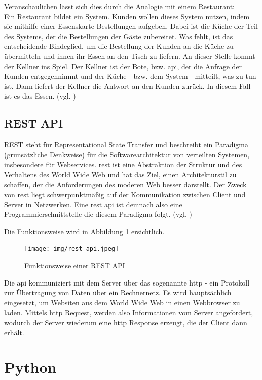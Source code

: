 \documentclass[oneside]{ausarbeitung}
\begin{document}
Veranschaulichen lässt sich dies durch die Analogie mit einem Restaurant: \\
Ein Restaurant bildet ein System. Kunden wollen dieses System nutzen, indem sie mithilfe einer Essenskarte Bestellungen aufgeben. Dabei ist die Küche der Teil des Systems, der die Bestellungen der Gäste zubereitet. Was fehlt, ist das entscheidende Bindeglied, um die Bestellung der Kunden an die Küche zu übermitteln und ihnen ihr Essen an den Tisch zu liefern. An dieser Stelle kommt der Kellner ins Spiel. Der Kellner ist der Bote, bzw. \ac{api}, der die Anfrage der Kunden entgegennimmt und der Küche - bzw. dem System - mitteilt, was zu tun ist. Dann liefert der Kellner die Antwort an den Kunden zurück. In diesem Fall ist es das Essen. (vgl. \cite{api_example})  

\subsection{REST API}
\label{sub:rest_api}
REST steht für Representational State Transfer und beschreibt ein Paradigma (grunsätzliche Denkweise) für die Softwarearchitektur von verteilten Systemen, insbesondere für Webservices. \ac{rest} ist eine Abstraktion der Struktur und des Verhaltens des World Wide Web und hat das Ziel, einen Architekturstil zu schaffen, der die Anforderungen des moderen Web besser darstellt. Der Zweck von \ac{rest} liegt schwerpunktmäßig auf der Kommunikation zwischen Client und Server in Netzwerken. Eine \ac{rest} \ac{api} ist demnach also eine Programmierschnittstelle die diesem Paradigma folgt. (vgl. \cite{rest})

Die Funktionsweise wird in Abbildung \ref{fig:5} ersichtlich.

\begin{figure}[H]
  \centering
  \texttt{[image: img/rest\_api.jpeg]}
  \caption{Funktionsweise einer REST API\cite{rest_pic}}
  \label{fig:5}
\end{figure}

Die \ac{api} kommuniziert mit dem Server über das sogenannte \ac{http} - ein Protokoll zur Übertragung von Daten über ein Rechnernetz. Es wird hauptsächlich eingesetzt, um Websiten aus dem World Wide Web in einen Webbrowser zu laden\cite{http_definition}. Mittels \ac{http} Request, werden also Informationen vom Server angefordert, wodurch der Server wiederum eine \ac{http} Response erzeugt, die der Client dann erhält.

\section{Python}
\label{sec:python}
\end{document}
